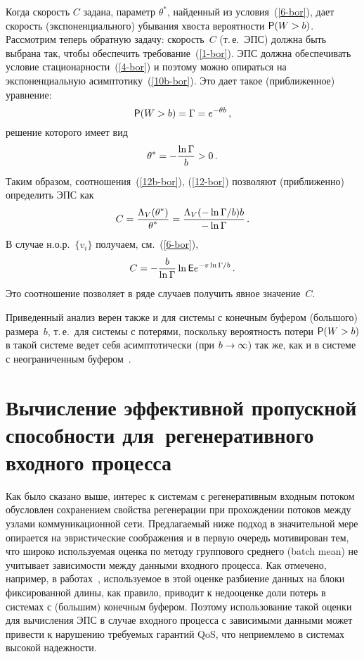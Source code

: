 \begin{multicols}{2}
Когда скорость   $C$  задана,
 параметр $\theta^*$, найденный из условия~(\ref{6-bor}),
дает  скорость (экспоненциального) убывания хвоста вероятности
${\sf P}(W>b)$. Рассмотрим теперь обратную задачу: скорость~$C$ (т.\,е.\
ЭПС) должна быть выбрана так, чтобы   обеспечить  требование~(\ref{1-bor}). 
ЭПС должна обеспечивать  условие стационарности~(\ref{4-bor})
и поэтому можно опираться на экспоненциальную асимптотику~(\ref{10b-bor}). 
Это дает такое (приближенное) уравнение:
 \begin{equation}
 {\sf P}(W>b)=\Gamma=e^{-\theta b}\,,\label{16a-bor}
 \end{equation}
решение которого имеет вид
\begin{equation}
 \theta^*=-\displaystyle\frac{\displaystyle \ln \Gamma\mathstrut}{\displaystyle b\mathstrut}>0\,. \label{12-bor}
\end{equation}
Таким образом, соотношения~(\ref{12b-bor}), (\ref{12-bor})  позволяют
(приближенно) определить ЭПС как
\begin{equation*}
C=\fr{\Lambda_V (\theta^*)}{\theta^*}=\fr{\Lambda_V(-\ln
\Gamma/b)b}{-\ln \Gamma}\,. %
\end{equation*}
В случае н.о.р.\ $\{v_i\}$ получаем, см.~(\ref{6-bor}),
\begin{equation*}
C=-\fr{b}{\ln \Gamma}\ln \e e^{-{v\ln \Gamma
}/b}\,. %
\end{equation*}
Это соотношение позволяет в ряде случаев получить явное  значение~$C$.

Приведенный  анализ
 верен также и для системы с конечным буфером
(большого) размера~$b$, т.\,е.\ для системы с потерями, поскольку
вероятность потери  $ {\sf P}(W> b)$  в такой системе ведет себя
асимптотически (при $b\hm\to \infty$) так же, как и в системе с
неограниченным буфером~\cite{Ganesh}.

\section{Вычисление  эффективной пропускной способности  для~регенеративного входного процесса}

Как было сказано выше,  интерес к  системам с регенеративным входным
потоком обусловлен сохранением свойства регенерации   при
прохождении потоков между узлами коммуникационной сети. Предлагаемый
ниже подход в значительной мере опирается на эвристические
соображения и в первую очередь мотивирован тем, что широко
используемая  оценка по методу группового среднего (batch mean) не
учитывает  зависимости между данными входного процесса. Как
отмечено, например, в работах~\cite{KRC, PPM09}, используемое в этой
оценке разбиение данных на блоки фиксированной длины, как правило,
приводит к недооценке доли потерь в системах  с (большим) конечным
буфером.  Поэтому использование такой оценки для вычисления ЭПС в
случае входного процесса с зависимыми данными может привести к
нарушению требуемых гарантий QoS, что неприемлемо в
системах высокой надежности.


\end{multicols}
